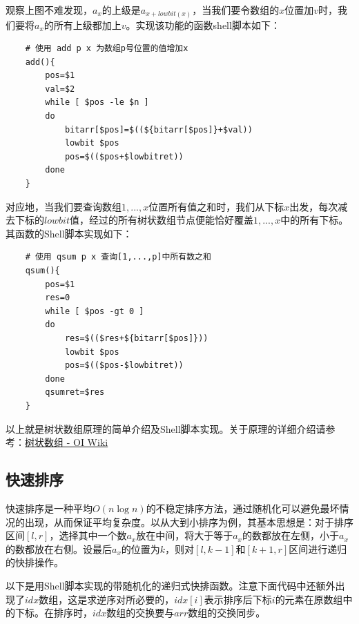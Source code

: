 \documentclass[UTF8]{ctexart}
\begin{document}
观察上图不难发现，$a_x$的上级是$a_{x+lowbit(x)}$，当我们要令数组的$x$位置加$v$时，我们要将$a_x$的所有上级都加上$v$。实现该功能的函数shell脚本如下：
 
\begin{verbatim}
    # 使用 add p x 为数组p号位置的值增加x
    add(){
        pos=$1
        val=$2
        while [ $pos -le $n ]
        do
            bitarr[$pos]=$((${bitarr[$pos]}+$val))
            lowbit $pos
            pos=$(($pos+$lowbitret))
        done
    }
\end{verbatim}

对应地，当我们要查询数组$1,...,x$位置所有值之和时，我们从下标$x$出发，每次减去下标的$lowbit$值，经过的所有树状数组节点便能恰好覆盖$1,...,x$中的所有下标。其函数的Shell脚本实现如下：

\begin{verbatim}
    # 使用 qsum p x 查询[1,...,p]中所有数之和
    qsum(){
        pos=$1
        res=0
        while [ $pos -gt 0 ]
        do
            res=$(($res+${bitarr[$pos]}))
            lowbit $pos
            pos=$(($pos-$lowbitret))
        done
        qsumret=$res
    }
\end{verbatim}

以上就是树状数组原理的简单介绍及Shell脚本实现。关于原理的详细介绍请参考：\href{https://oi-wiki.org/ds/fenwick/}{树状数组 - OI Wiki}

\subsection{快速排序}

快速排序是一种平均$O(n\log n)$的不稳定排序方法，通过随机化可以避免最坏情况的出现，从而保证平均复杂度。以从大到小排序为例，其基本思想是：对于排序区间$[l,r]$，选择其中一个数$a_x$放在中间，将大于等于$a_x$的数都放在左侧，小于$a_x$的数都放在右侧。设最后$a_x$的位置为$k$，则对$[l,k-1]$和$[k+1,r]$区间进行递归的快排操作。

以下是用Shell脚本实现的带随机化的递归式快排函数。注意下面代码中还额外出现了$idx$数组，这是求逆序对所必要的，$idx[i]$表示排序后下标$i$的元素在原数组中的下标。在排序时，$idx$数组的交换要与$arr$数组的交换同步。
\end{document}
